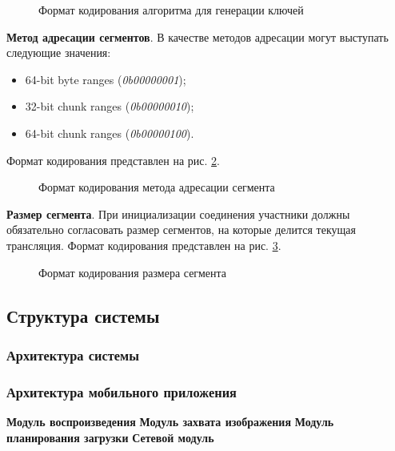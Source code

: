 		\begin{figure}[h]
			\caption{Формат кодирования алгоритма для генерации ключей}
			\label{img:ppspp-lsa-option}
		\end{figure}

		\textbf{Метод адресации сегментов}. В качестве методов адресации могут выступать следующие значения:
		\begin{itemize}
			\item 64-bit byte ranges (\textit{0b00000001});
			\item 32-bit chunk ranges (\textit{0b00000010});
			\item 64-bit chunk ranges (\textit{0b00000100}).
		\end{itemize}
		Формат кодирования представлен на рис. \ref{img:ppspp-cam-option}.

		\begin{figure}[h]
			\caption{Формат кодирования метода адресации сегмента}
			\label{img:ppspp-cam-option}
		\end{figure}

		\textbf{Размер сегмента}. При инициализации соединения участники должны обязательно согласовать размер сегментов,
		на которые делится текущая трансляция. Формат кодирования представлен на рис. \ref{img:ppspp-chunk-size-option}.

		\begin{figure}[h]
			\caption{Формат кодирования размера сегмента}
			\label{img:ppspp-chunk-size-option}
		\end{figure}

	\subsection{Структура системы}
		\subsubsection{Архитектура системы}
		\subsubsection{Архитектура мобильного приложения}
		\textbf{Модуль воспроизведения}
		\textbf{Модуль захвата изображения}
		\textbf{Модуль планирования загрузки}
		\textbf{Сетевой модуль}
